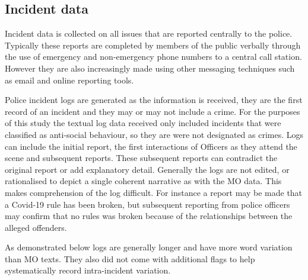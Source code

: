 \subsection{Incident data} Incident data is collected on all issues that are reported centrally to the police. Typically these reports are completed by members of the public verbally through the use of emergency and non-emergency phone numbers to a central call station. However they are also increasingly made using other messaging techniques such as email and online reporting tools. 

Police incident logs are generated as the information is received, they are the first record of an incident and they may or may not include a crime. For the purposes of this study the textual log data received only included incidents that were classified as anti-social behaviour, so they are were not designated as crimes. Logs can include the initial report, the first interactions of Officers as they attend the scene and subsequent reports. These subsequent reports can contradict the original report or add explanatory detail. Generally the logs are not edited, or rationalised to depict a single coherent narrative as with the MO data. This makes comprehension of the log difficult. For instance a report may be made that a Covid-19 rule has been broken, but subsequent reporting from police officers may confirm that no rules was broken because of the relationships between the alleged offenders.

As demonstrated below logs are generally longer and have more word variation than MO texts. They also did not come with additional flags to help systematically record intra-incident variation.


